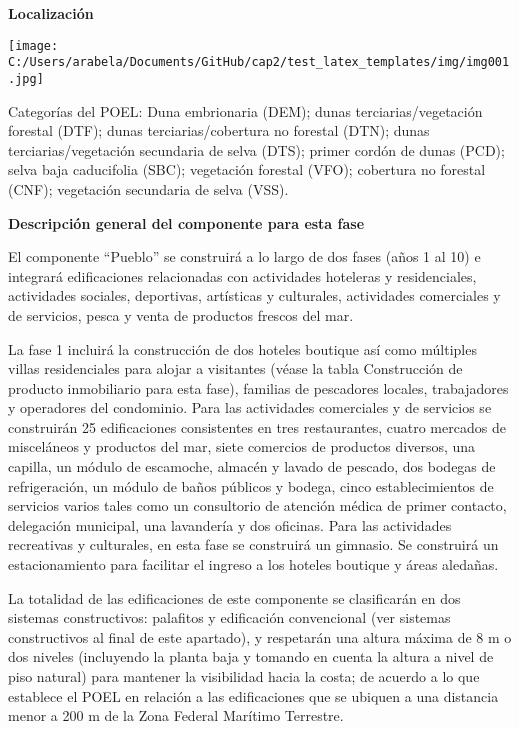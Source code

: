 \documentclass[twoside]{article}
\begin{document}
\begin{multicols}{2}

\bigskip

\footnotesize\textcolor{myblue2} {\textbf{ Localización}}


\bigskip

 \texttt{[image: C:/Users/arabela/Documents/GitHub/cap2/test\_latex\_templates/img/img001.jpg]}


\bigskip


\bigskip

\footnotesize Categorías del POEL: Duna embrionaria (DEM); dunas terciarias/vegetación forestal (DTF); dunas terciarias/cobertura no forestal (DTN); dunas terciarias/vegetación secundaria de selva (DTS); primer cordón de dunas (PCD); selva baja caducifolia (SBC); vegetación forestal (VFO); cobertura no forestal (CNF); vegetación secundaria de selva (VSS).


\bigskip


\bigskip

\textcolor{myblue2} {\textbf{Descripción general del componente para esta fase}}


\bigskip

\footnotesize El componente “Pueblo” se construirá a lo largo de dos fases (años 1 al 10) e integrará edificaciones relacionadas con actividades hoteleras y residenciales, actividades sociales, deportivas, artísticas y culturales, actividades comerciales y de servicios, pesca y venta de productos frescos del mar.

La fase 1 incluirá la construcción de dos hoteles boutique así como múltiples villas residenciales para alojar a visitantes (véase la tabla Construcción de producto inmobiliario para esta fase), familias de pescadores locales, trabajadores y operadores del condominio. Para las actividades comerciales y de servicios se construirán 25 edificaciones consistentes en tres restaurantes, cuatro mercados de misceláneos y productos del mar, siete comercios de productos diversos, una capilla, un módulo de escamoche, almacén y lavado de pescado, dos bodegas de refrigeración, un módulo de baños públicos y bodega, cinco establecimientos de servicios varios tales como un consultorio de atención médica de primer contacto, delegación municipal, una lavandería y dos oficinas. Para las actividades recreativas y culturales, en esta fase se construirá un gimnasio. Se construirá un estacionamiento para facilitar el ingreso a los hoteles boutique y áreas aledañas.

La totalidad de las edificaciones de este componente se clasificarán en dos sistemas constructivos: palafitos y edificación convencional (ver sistemas constructivos al final de este apartado), y respetarán una altura máxima de 8 m o dos niveles (incluyendo la planta baja y tomando en cuenta la altura a nivel de piso natural) para mantener la visibilidad hacia la costa; de acuerdo a lo que establece el POEL en relación a las edificaciones que se ubiquen a una distancia menor a 200 m de la Zona Federal Marítimo Terrestre.


\end{multicols}
\end{document}
